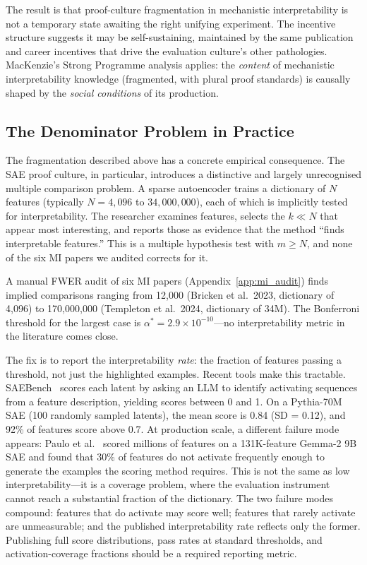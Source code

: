\documentclass{article}
\begin{document}
The result is that proof-culture fragmentation in mechanistic interpretability is not a temporary state awaiting the right unifying experiment. The incentive structure suggests it may be self-sustaining, maintained by the same publication and career incentives that drive the evaluation culture's other pathologies. MacKenzie's Strong Programme analysis applies: the \textit{content} of mechanistic interpretability knowledge (fragmented, with plural proof standards) is causally shaped by the \textit{social conditions} of its production.

\subsection{The Denominator Problem in Practice}

The fragmentation described above has a concrete empirical consequence. The SAE proof culture, in particular, introduces a distinctive and largely unrecognised multiple comparison problem. A sparse autoencoder trains a dictionary of $N$ features (typically $N = 4{,}096$ to $34{,}000{,}000$), each of which is implicitly tested for interpretability. The researcher examines features, selects the $k \ll N$ that appear most interesting, and reports those as evidence that the method ``finds interpretable features.'' This is a multiple hypothesis test with $m \geq N$, and none of the six MI papers we audited corrects for it.

A manual FWER audit of six MI papers (Appendix~\ref{app:mi_audit}) finds implied comparisons ranging from 12,000 (Bricken et al.\ 2023, dictionary of 4,096) to 170,000,000 (Templeton et al.\ 2024, dictionary of 34M). The Bonferroni threshold for the largest case is $\alpha^* = 2.9 \times 10^{-10}$---no interpretability metric in the literature comes close.

The fix is to report the interpretability \textit{rate}: the fraction of features passing a threshold, not just the highlighted examples. Recent tools make this tractable. SAEBench~\citep{karvonen_saebench_2025} scores each latent by asking an LLM to identify activating sequences from a feature description, yielding scores between 0 and 1. On a Pythia-70M SAE (100 randomly sampled latents), the mean score is 0.84 (SD = 0.12), and 92\% of features score above 0.7. At production scale, a different failure mode appears: Paulo et al.~\citep{paulo_autointerp_2024} scored millions of features on a 131K-feature Gemma-2 9B SAE and found that 30\% of features do not activate frequently enough to generate the examples the scoring method requires. This is not the same as low interpretability---it is a coverage problem, where the evaluation instrument cannot reach a substantial fraction of the dictionary. The two failure modes compound: features that do activate may score well; features that rarely activate are unmeasurable; and the published interpretability rate reflects only the former. Publishing full score distributions, pass rates at standard thresholds, and activation-coverage fractions should be a required reporting metric.
\end{document}
